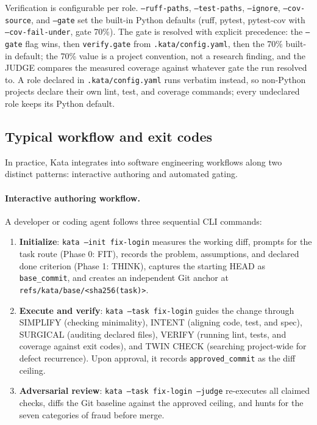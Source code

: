\documentclass[11pt]{article}
\begin{document}
Verification is configurable per role. \texttt{--ruff-paths},
\texttt{--test-paths}, \texttt{--ignore}, \texttt{--cov-source}, and
\texttt{--gate} set the built-in Python defaults (ruff, pytest, pytest-cov
with \texttt{--cov-fail-under}, gate 70\%). The gate is resolved with
explicit precedence: the \texttt{--gate} flag wins, then
\texttt{verify.gate} from \texttt{.kata/config.yaml}, then the 70\%
built-in default; the 70\% value is a project convention, not a research
finding, and the JUDGE compares the measured coverage against whatever
gate the run resolved to. A role declared in
\texttt{.kata/config.yaml} runs verbatim instead, so non-Python projects
declare their own lint, test, and coverage commands; every undeclared role
keeps its Python default.

\subsection{Typical workflow and exit codes}

In practice, Kata integrates into software engineering workflows along two
distinct patterns: interactive authoring and automated gating.

\paragraph{Interactive authoring workflow.} A developer or coding agent
follows three sequential CLI commands:
\begin{enumerate}
\item \textbf{Initialize}: \texttt{kata --init fix-login} measures the working diff,
prompts for the task route (Phase 0: FIT), records the problem, assumptions,
and declared done criterion (Phase 1: THINK), captures the starting HEAD as
\texttt{base\_commit}, and creates an independent Git anchor at
\texttt{refs/kata/base/<sha256(task)>}.
\item \textbf{Execute and verify}: \texttt{kata --task fix-login} guides the
change through SIMPLIFY (checking minimality), INTENT (aligning code, test,
and spec), SURGICAL (auditing declared files), VERIFY (running lint, tests,
and coverage against exit codes), and TWIN CHECK (searching project-wide for
defect recurrence). Upon approval, it records \texttt{approved\_commit} as the
diff ceiling.
\item \textbf{Adversarial review}: \texttt{kata --task fix-login --judge}
re-executes all claimed checks, diffs the Git baseline against the approved
ceiling, and hunts for the seven categories of fraud before merge.
\end{enumerate}
\end{document}
